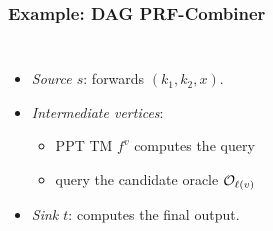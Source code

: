 \begin{frame}[fragile]
    \frametitle{Example: DAG PRF-Combiner}

    \begin{columns}[T]
        \begin{itemize}\setlength\itemsep{1em}
            \item<1-> \emph{Source $s$}: forwards $(k_1, k_2, x)$.
            \item<2-> \emph{Intermediate vertices}:
                \begin{itemize}\setlength\itemsep{0.2em}
                    \item<2-> PPT TM $f^v$ computes the query
                    \item<3-> query the candidate oracle $\mathcal{O}_{\ell(v)}$
                \end{itemize}
            \item<5-> \emph{Sink $t$}: computes the final output.
        \end{itemize}


\end{columns}
\end{frame}
